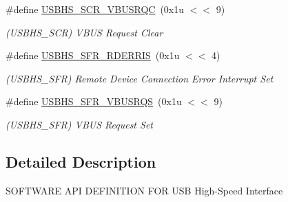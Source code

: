 \begin{DoxyCompactItemize}
\mbox{\label{group__SAME70__USBHS_gad1e871610733843b30fb93043b28f9a2}} 
\#define \mbox{\hyperlink{group__SAME70__USBHS_gad1e871610733843b30fb93043b28f9a2}{U\+S\+B\+H\+S\+\_\+\+S\+C\+R\+\_\+\+V\+B\+U\+S\+R\+QC}}~(0x1u $<$$<$ 9)
\begin{DoxyCompactList}\small\item\em (U\+S\+B\+H\+S\+\_\+\+S\+CR) V\+B\+US Request Clear \end{DoxyCompactList}\item 
\mbox{\label{group__SAME70__USBHS_ga76b0735f9ffeb525f9723d4a1796aae0}} 
\#define \mbox{\hyperlink{group__SAME70__USBHS_ga76b0735f9ffeb525f9723d4a1796aae0}{U\+S\+B\+H\+S\+\_\+\+S\+F\+R\+\_\+\+R\+D\+E\+R\+R\+IS}}~(0x1u $<$$<$ 4)
\begin{DoxyCompactList}\small\item\em (U\+S\+B\+H\+S\+\_\+\+S\+FR) Remote Device Connection Error Interrupt Set \end{DoxyCompactList}\item 
\mbox{\label{group__SAME70__USBHS_ga1a1d4d07e12a2208954896e8ffe64c81}} 
\#define \mbox{\hyperlink{group__SAME70__USBHS_ga1a1d4d07e12a2208954896e8ffe64c81}{U\+S\+B\+H\+S\+\_\+\+S\+F\+R\+\_\+\+V\+B\+U\+S\+R\+QS}}~(0x1u $<$$<$ 9)
\begin{DoxyCompactList}\small\item\em (U\+S\+B\+H\+S\+\_\+\+S\+FR) V\+B\+US Request Set \end{DoxyCompactList}\end{DoxyCompactItemize}


\subsection{Detailed Description}
S\+O\+F\+T\+W\+A\+RE A\+PI D\+E\+F\+I\+N\+I\+T\+I\+ON F\+OR U\+SB High-\/\+Speed Interface 